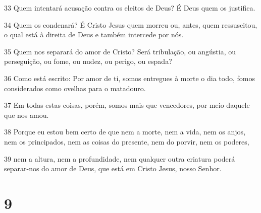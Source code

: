 \par 33 Quem intentará acusação contra os eleitos de Deus? É Deus quem os justifica.
\par 34 Quem os condenará? É Cristo Jesus quem morreu ou, antes, quem ressuscitou, o qual está à direita de Deus e também intercede por nós.
\par 35 Quem nos separará do amor de Cristo? Será tribulação, ou angústia, ou perseguição, ou fome, ou nudez, ou perigo, ou espada?
\par 36 Como está escrito: Por amor de ti, somos entregues à morte o dia todo, fomos considerados como ovelhas para o matadouro.
\par 37 Em todas estas coisas, porém, somos mais que vencedores, por meio daquele que nos amou.
\par 38 Porque eu estou bem certo de que nem a morte, nem a vida, nem os anjos, nem os principados, nem as coisas do presente, nem do porvir, nem os poderes,
\par 39 nem a altura, nem a profundidade, nem qualquer outra criatura poderá separar-nos do amor de Deus, que está em Cristo Jesus, nosso Senhor.

\chapter{9}

